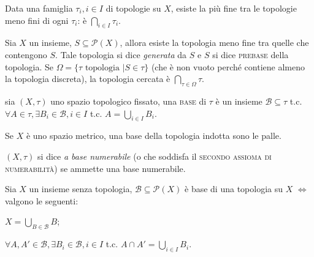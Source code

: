 \documentclass{article}
\begin{document}
\begin{cor}
	Data una famiglia $\tau_i, i \in I$ di topologie su $X$, esiste la più fine tra le topologie meno fini di ogni $\tau_i$: è $\displaystyle \bigcap_{i \in I} \tau_i$.
\end{cor}

\begin{cor}
	Sia $X$ un insieme, $S \subseteq \mathcal{P}(X)$, allora esiste la topologia meno fine tra quelle che contengono $S$. Tale topologia si dice \textit{generata} da $S$ e $S$ si dice \textsc{prebase} della topologia. Se $\Omega= \{ \tau \text{ topologia } | S \in \tau \}$ (che è non vuoto perché contiene almeno la topologia discreta), la topologia cercata è $\displaystyle \bigcap_{\tau \in \Omega} \tau$.
\end{cor}

\begin{defn}
	sia $(X, \tau)$ uno spazio topologico fissato, una \textsc{base} di $\tau$ è un insieme $\mathcal{B} \subseteq \tau$ t.c. $\forall A \in \tau, \exists B_i \in \mathcal{B}, i \in I$ t.c. $\displaystyle A= \bigcup_{i \in I} B_i$.
\end{defn}

\begin{ex}
	Se $X$ è uno spazio metrico, una base della topologia indotta sono le palle.
\end{ex}

\begin{defn} \label{N2}
	$(X, \tau)$ si dice \textit{a base numerabile} (o che soddisfa il \textsc{secondo assioma di numerabilità}) se ammette una base numerabile.
\end{defn}

\begin{prop} \label{base}
	Sia $X$ un insieme senza topologia, $\mathcal{B} \subseteq \mathcal{P}(X)$ è base di una topologia su $X$ $\Leftrightarrow$ valgono le seguenti: \\
	\begin{nlist}
		\item $\displaystyle X=\bigcup_{B \in \mathcal{B}} B$;
		\item $\forall A, A' \in \mathcal{B}, \exists B_i \in \mathcal{B}, i \in I$ t.c. $\displaystyle A \cap A'= \bigcup_{i \in I} B_i$.
	\end{nlist}
\end{prop}
\end{document}
